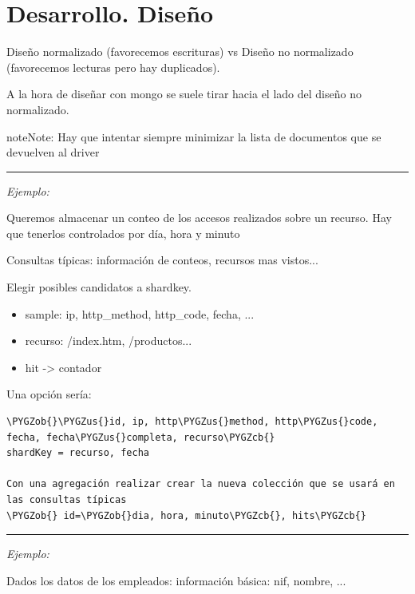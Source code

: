 \documentclass[a4paper,10pt,english]{sphinxmanual}
\def\PYGZus{\char`\_}
\def\PYGZob{\char`\{}
\def\PYGZcb{\char`\}}
\begin{document}
\chapter{Desarrollo. Diseño}
\label{contents/disenho::doc}\label{contents/disenho:desarrollo-diseno}
Diseño normalizado (favorecemos escrituras) vs Diseño no normalizado (favorecemos lecturas pero hay duplicados).

A la hora de diseñar con mongo se suele tirar hacia el lado del diseño no normalizado.

\begin{notice}{note}{Note:}
Hay que intentar siempre minimizar la lista de documentos que se devuelven al driver
\end{notice}


\bigskip\hrule{}\bigskip


\emph{Ejemplo:}

Queremos almacenar un conteo de los accesos realizados sobre un recurso. Hay que tenerlos controlados por día, hora y minuto

Consultas típicas: información de conteos, recursos mas vistos...

Elegir posibles candidatos a shardkey.
\begin{itemize}
\item {} 
sample: ip, http\_method, http\_code, fecha, ...

\item {} 
recurso: /index.htm, /productos...

\item {} 
hit -\textgreater{} contador

\end{itemize}

Una opción sería:

\begin{Verbatim}[commandchars=\\\{\}]
\PYGZob{}\PYGZus{}id, ip, http\PYGZus{}method, http\PYGZus{}code, fecha, fecha\PYGZus{}completa, recurso\PYGZcb{}
shardKey = recurso, fecha

Con una agregación realizar crear la nueva colección que se usará en las consultas típicas
\PYGZob{} id=\PYGZob{}dia, hora, minuto\PYGZcb{}, hits\PYGZcb{}
\end{Verbatim}


\bigskip\hrule{}\bigskip


\emph{Ejemplo:}

Dados los datos de los empleados: información básica: nif, nombre, ...
\end{document}
